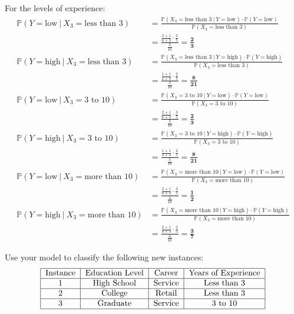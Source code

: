 \documentclass[12pt]{article}
\newcommand{\prob}[1]{\mathbb{P}(#1)}
\newcommand{\cprob}[2]{\prob{#1 ~|~ #2}}
\newcommand{\low}{\text{low}}
\newcommand{\high}{\text{high}}
\begin{document}
For the levels of experience: $$ \begin{aligned} 
\cprob{Y = \low}{X_3 = \text{less than 3}} &= \frac{\cprob{X_3 = \text{less than 3}}{Y = \low} \cdot \prob{Y = \low}}{\prob{X_3 = \text{less than 3}}} \\ &= \frac{\frac{2+1}{6+3} \cdot \frac{3}{5}}{\frac{3}{10}} = \bm{\frac{2}{3}} \\
\cprob{Y = \high}{X_3 = \text{less than 3}} &= \frac{\cprob{X_3 = \text{less than 3}}{Y = \high} \cdot \prob{Y = \high}}{\prob{X_3 = \text{less than 3}}} \\ &= \frac{\frac{1+1}{4+3} \cdot \frac{2}{5}}{\frac{3}{10}} = \bm{\frac{8}{21}} \\ 
\cprob{Y = \low}{X_3 = \text{3 to 10}} &= \frac{\cprob{X_3 = \text{3 to 10}}{Y = \low} \cdot \prob{Y = \low}}{\prob{X_3 = \text{3 to 10}}} \\ &= \frac{\frac{2+1}{6+3} \cdot \frac{3}{5}}{\frac{3}{10}} = \bm{\frac{2}{3}} \\ 
\cprob{Y = \high}{X_3 = \text{3 to 10}} &= \frac{\cprob{X_3 = \text{3 to 10}}{Y = \high} \cdot \prob{Y = \high}}{\prob{X_3 = \text{3 to 10}}} \\ &= \frac{\frac{1+1}{4+3} \cdot \frac{2}{5}}{\frac{3}{10}} = \bm{\frac{8}{21}} \\
\cprob{Y = \low}{X_3 = \text{more than 10}} &= \frac{\cprob{X_3 = \text{more than 10}}{Y = \low} \cdot \prob{Y = \low}}{\prob{X_3 = \text{more than 10}}} \\ &= \frac{\frac{2+1}{6+3} \cdot \frac{3}{5}}{\frac{4}{10}} = \bm{\frac{1}{2}} \\ 
\cprob{Y = \high}{X_3 = \text{more than 10}} &= \frac{\cprob{X_3 = \text{more than 10}}{Y = \high} \cdot \prob{Y = \high}}{\prob{X_3 = \text{more than 10}}} \\ &= \frac{\frac{2+1}{4+3} \cdot \frac{2}{5}}{\frac{4}{10}} = \bm{\frac{3}{7}} \end{aligned} $$ 


Use your model to classify the following new instances: 
$$ \begin{tabular}{|c|c|c|c|} \hline 
Instance & Education Level & Career & Years of Experience \\ \hline 
1 & High School & Service & Less than 3 \\ \hline 
2 & College & Retail & Less than 3 \\ \hline 
3 & Graduate & Service & 3 to 10 \\ \hline \end{tabular} $$ 
\end{document}
